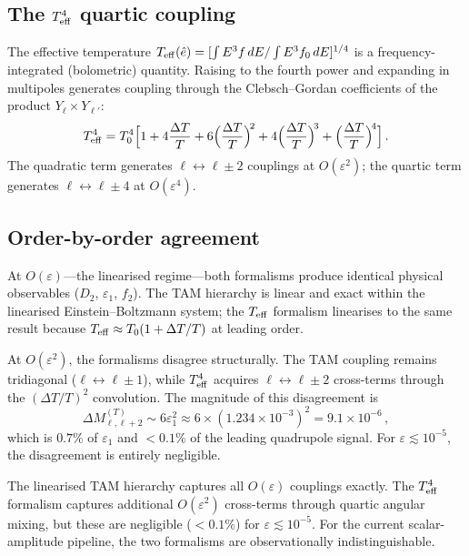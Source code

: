 \subsection{The $T_{\mathrm{eff}}^4$ quartic coupling}

The effective temperature
$T_{\mathrm{eff}}(\hat{e}) = [\int E^3 f\,dE / \int E^3 f_0\,dE]^{1/4}$
is a frequency-integrated (bolometric) quantity.  Raising to the
fourth power and expanding in multipoles generates coupling
through the Clebsch--Gordan coefficients of the product
$Y_\ell \times Y_{\ell'}$:
\begin{equation}\label{eq:Teff4-coupling}
T_{\mathrm{eff}}^4
= T_0^4\Bigl[
1 + 4\frac{\Delta T}{T}
+ 6\Bigl(\frac{\Delta T}{T}\Bigr)^{\!2}
+ 4\Bigl(\frac{\Delta T}{T}\Bigr)^{\!3}
+ \Bigl(\frac{\Delta T}{T}\Bigr)^{\!4}\Bigr]\,.
\end{equation}
The quadratic term generates $\ell \leftrightarrow \ell \pm 2$
couplings at $O(\varepsilon^2)$; the quartic term generates
$\ell \leftrightarrow \ell \pm 4$ at $O(\varepsilon^4)$.

\subsection{Order-by-order agreement}

At $O(\varepsilon)$---the linearised regime---both formalisms
produce identical physical observables ($D_2$, $\varepsilon_1$,
$f_2$).  The TAM hierarchy is linear and exact within the
linearised Einstein--Boltzmann system; the $T_{\mathrm{eff}}$ formalism
linearises to the same result because $T_{\mathrm{eff}} \approx T_0(1 +
\Delta T/T)$ at leading order.

At $O(\varepsilon^2)$, the formalisms disagree structurally.
The TAM coupling remains tridiagonal ($\ell \leftrightarrow
\ell \pm 1$), while $T_{\mathrm{eff}}^4$ acquires $\ell \leftrightarrow
\ell \pm 2$ cross-terms through the $(\Delta T/T)^2$
convolution.  The magnitude of this disagreement is
\begin{equation}\label{eq:disagreement}
\Delta M_{\ell,\ell+2}^{(T)}
\sim 6\varepsilon_1^2
\approx 6 \times (1.234 \times 10^{-3})^2
= 9.1 \times 10^{-6}\,,
\end{equation}
which is $0.7\%$ of $\varepsilon_1$ and $< 0.1\%$ of the
leading quadrupole signal.  For $\varepsilon \lesssim 10^{-5}$,
the disagreement is entirely negligible.

\begin{proposition}
\label{prop:TAM-Teff}
The linearised TAM hierarchy captures all $O(\varepsilon)$
couplings exactly.  The $T_{\mathrm{eff}}^4$ formalism captures
additional $O(\varepsilon^2)$ cross-terms through quartic
angular mixing, but these are negligible ($< 0.1\%$) for
$\varepsilon \lesssim 10^{-5}$.  For the current
scalar-amplitude pipeline, the two formalisms are
observationally indistinguishable.
\end{proposition}

